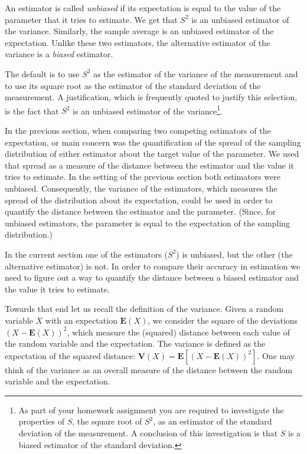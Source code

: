 \documentclass[
]{krantz}
\newcommand{\Expec}{\mathbf{E}}
\newcommand{\Var}{\mathbf{V}}
\theoremstyle{definition}
\theoremstyle{definition}
\theoremstyle{definition}
\theoremstyle{remark}
\begin{document}
An estimator is called \emph{unbiased} if its expectation is equal to the
value of the parameter that it tries to estimate. We get that \(S^2\) is
an unbiased estimator of the variance. Similarly, the sample average is
an unbiased estimator of the expectation. Unlike these two estimators,
the alternative estimator of the variance is a \emph{biased} estimator.

The default is to use \(S^2\) as the estimator of the variance of the
measurement and to use its square root as the estimator of the standard
deviation of the measurement. A justification, which is frequently
quoted to justify this selection, is the fact that \(S^2\) is an unbiased
estimator of the variance\footnote{As part of your homework assignment you are required to
  investigate the properties of \(S\), the square root of \(S^2\), as an
  estimator of the standard deviation of the measurement. A conclusion
  of this investigation is that \(S\) is a biased estimator of the
  standard deviation.}.

In the previous section, when comparing two competing estimators of the
expectation, or main concern was the quantification of the spread of the
sampling distribution of either estimator about the target value of the
parameter. We used that spread as a measure of the distance between the
estimator and the value it tries to estimate. In the setting of the
previous section both estimators were unbiased. Consequently, the
variance of the estimators, which measures the spread of the
distribution about its expectation, could be used in order to quantify
the distance between the estimator and the parameter. (Since, for
unbiased estimators, the parameter is equal to the expectation of the
sampling distribution.)

In the current section one of the estimators (\(S^2\)) is unbiased, but
the other (the alternative estimator) is not. In order to compare their
accuracy in estimation we need to figure out a way to quantify the
distance between a biased estimator and the value it tries to estimate.

Towards that end let us recall the definition of the variance. Given a
random variable \(X\) with an expectation \(\Expec(X)\), we consider the
square of the deviations \((X - \Expec(X))^2\), which measure the
(squared) distance between each value of the random variable and the
expectation. The variance is defined as the expectation of the squared
distance: \(\Var(X) = \Expec[(X-\Expec(X))^2]\). One may think of the
variance as an overall measure of the distance between the random
variable and the expectation.
\end{document}
